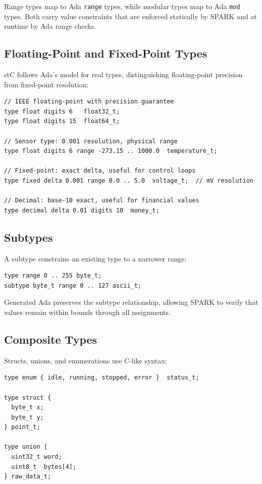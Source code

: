 \documentclass[runningheads]{llncs}
\begin{document}
Range types map to Ada \texttt{range} types, while modular types map to Ada
\texttt{mod} types. Both carry value constraints that are enforced statically
by SPARK and at runtime by Ada range checks.

\subsection{Floating-Point and Fixed-Point Types}

stC follows Ada's model for real types, distinguishing floating-point precision
from fixed-point resolution:

\begin{lstlisting}[caption={Real number type declarations}]
// IEEE floating-point with precision guarantee
type float digits 6   float32_t;
type float digits 15  float64_t;

// Sensor type: 0.001 resolution, physical range
type float digits 6 range -273.15 .. 1000.0  temperature_t;

// Fixed-point: exact delta, useful for control loops
type fixed delta 0.001 range 0.0 .. 5.0  voltage_t;  // mV resolution

// Decimal: base-10 exact, useful for financial values
type decimal delta 0.01 digits 10  money_t;
\end{lstlisting}

\subsection{Subtypes}

A subtype constrains an existing type to a narrower range:

\begin{lstlisting}[caption={Subtype declaration}]
type range 0 .. 255 byte_t;
subtype byte_t range 0 .. 127 ascii_t;
\end{lstlisting}

Generated Ada preserves the subtype relationship, allowing SPARK to verify
that values remain within bounds through all assignments.

\subsection{Composite Types}

Structs, unions, and enumerations use C-like syntax:

\begin{lstlisting}[caption={Composite types}]
type enum { idle, running, stopped, error }  status_t;

type struct {
  byte_t x;
  byte_t y;
} point_t;

type union {
  uint32_t word;
  uint8_t  bytes[4];
} raw_data_t;
\end{lstlisting}
\end{document}
